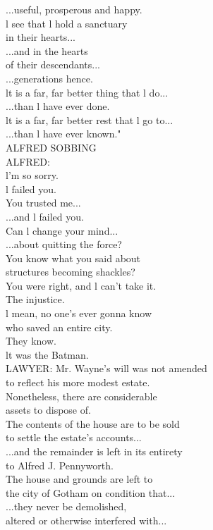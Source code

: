 \documentclass{article}
\begin{document}
\begin{multicols}{3}
...useful, prosperous and happy.\\
l see that l hold a sanctuary\\
in their hearts...\\
...and in the hearts\\
of their descendants...\\
...generations hence.\\
lt is a far, far better thing that l do...\\
...than l have ever done.\\
lt is a far, far better rest that l go to...\\
...than l have ever known."\\
ALFRED SOBBING\\
ALFRED:\\
l'm so sorry.\\
l failed you.\\
You trusted me...\\
...and l failed you.\\
Can l change your mind...\\
...about quitting the force?\\
You know what you said about\\
structures becoming shackles?\\
You were right, and l can't take it.\\
The injustice.\\
l mean, no one's ever gonna know\\
who saved an entire city.\\
They know.\\
lt was the Batman.\\
LAWYER: Mr. Wayne's will was not amended\\
to reflect his more modest estate.\\
Nonetheless, there are considerable\\
assets to dispose of.\\
The contents of the house are to be sold\\
to settle the estate's accounts...\\
...and the remainder is left in its entirety\\
to Alfred J. Pennyworth.\\
The house and grounds are left to\\
the city of Gotham on condition that...\\
...they never be demolished,\\
altered or otherwise interfered with...\\

\end{multicols}
\end{document}
